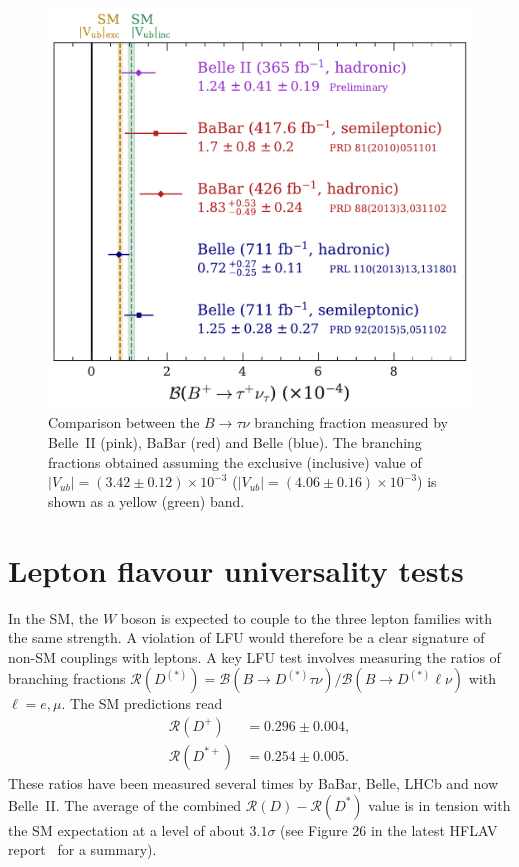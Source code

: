 \documentclass{moriond}
\def\bea{\begin{eqnarray}}
\def\eea{\end{eqnarray}}
\def\vub{V_{ub}}
\def\rd{\mathcal{R}\left(D\right)}
\def\rdp{\mathcal{R}\left(D^+\right)}
\def\rdst{\mathcal{R}\left(D^*\right)}
\def\rdstp{\mathcal{R}\left(D^{*+}\right)}
\def\rddst{\mathcal{R}\left(D^{(*)}\right)}
\begin{document}
\begin{figure}[h!]
    \centering
    \includegraphics[scale=0.4]{Final_Unblinding_.pdf}
    \caption{Comparison between the $B \to \tau\nu$ branching fraction measured by Belle~II (pink), BaBar (red) and Belle (blue). The branching fractions obtained assuming the exclusive (inclusive) value of $|\vub| = (3.42 \pm 0.12)\times 10^{-3}$ ($|\vub| = (4.06 \pm 0.16)\times 10^{-3}$) is shown as a yellow (green) band.}
    \label{fig:Final_Unblinding_}
\end{figure}

\section{Lepton flavour universality tests}
In the SM, the $W$ boson is expected to couple to the three lepton families with the same strength. A violation of LFU would therefore be a clear signature of non-SM couplings with leptons. A key LFU test involves measuring the ratios of branching fractions $\rddst = \mathcal{B}(B \to D^{(*)}\tau\nu)/\mathcal{B}(B \to D^{(*)}\ell\nu)$ with $\ell=e,\mu$. The SM predictions read
\bea
    \rdp &= 0.296 \pm 0.004, \\
    \rdstp &= 0.254 \pm 0.005.
\eea
These ratios have been measured several times by BaBar, Belle, LHCb and now Belle~II. The average of the combined $\rd-\rdst$ value is in tension with the SM expectation at a level of about $3.1\sigma$ (see Figure 26 in the latest HFLAV report~\cite{hflav} for a summary).
\end{document}
